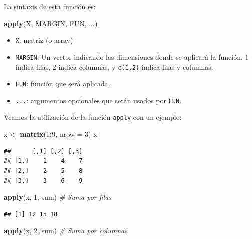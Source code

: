 \documentclass[]{book}
\newenvironment{Shaded}{\begin{snugshade}}{\end{snugshade}}
\newcommand{\KeywordTok}[1]{\textcolor[rgb]{0.13,0.29,0.53}{\textbf{#1}}}
\newcommand{\DataTypeTok}[1]{\textcolor[rgb]{0.13,0.29,0.53}{#1}}
\newcommand{\DecValTok}[1]{\textcolor[rgb]{0.00,0.00,0.81}{#1}}
\newcommand{\StringTok}[1]{\textcolor[rgb]{0.31,0.60,0.02}{#1}}
\newcommand{\CommentTok}[1]{\textcolor[rgb]{0.56,0.35,0.01}{\textit{#1}}}
\newcommand{\OperatorTok}[1]{\textcolor[rgb]{0.81,0.36,0.00}{\textbf{#1}}}
\newcommand{\NormalTok}[1]{#1}
\providecommand{\tightlist}{%
  \setlength{\itemsep}{0pt}\setlength{\parskip}{0pt}}
\begin{document}
La sintaxis de esta función es:

\begin{Shaded}
\begin{Highlighting}[]
\KeywordTok{apply}\NormalTok{(X, MARGIN, FUN, ...)}
\end{Highlighting}
\end{Shaded}

\begin{itemize}
\tightlist
\item
  \texttt{X}: matriz (o array)
\item
  \texttt{MARGIN}: Un vector indicando las dimensiones donde se aplicará
  la función. 1 indica filas, 2 indica columnas, y \texttt{c(1,2)}
  indica filas y columnas.
\item
  \texttt{FUN}: función que será aplicada.
\item
  \texttt{...}: argumentos opcionales que serán usados por \texttt{FUN}.
\end{itemize}

Veamos la utilización de la función \texttt{apply} con un ejemplo:

\begin{Shaded}
\begin{Highlighting}[]
\NormalTok{x <-}\StringTok{ }\KeywordTok{matrix}\NormalTok{(}\DecValTok{1}\OperatorTok{:}\DecValTok{9}\NormalTok{, }\DataTypeTok{nrow =} \DecValTok{3}\NormalTok{)}
\NormalTok{x}
\end{Highlighting}
\end{Shaded}

\begin{verbatim}
##      [,1] [,2] [,3]
## [1,]    1    4    7
## [2,]    2    5    8
## [3,]    3    6    9
\end{verbatim}

\begin{Shaded}
\begin{Highlighting}[]
\KeywordTok{apply}\NormalTok{(x, }\DecValTok{1}\NormalTok{, sum)    }\CommentTok{# Suma por filas}
\end{Highlighting}
\end{Shaded}

\begin{verbatim}
## [1] 12 15 18
\end{verbatim}

\begin{Shaded}
\begin{Highlighting}[]
\KeywordTok{apply}\NormalTok{(x, }\DecValTok{2}\NormalTok{, sum)    }\CommentTok{# Suma por columnas}
\end{Highlighting}
\end{Shaded}
\end{document}
